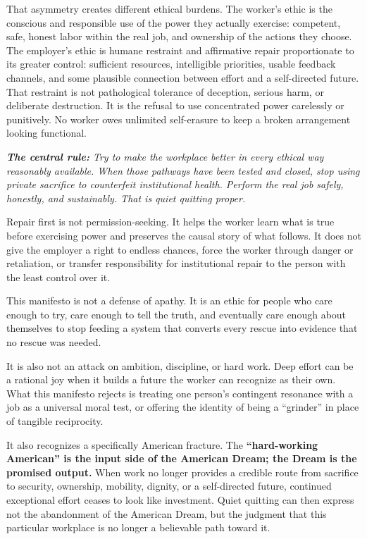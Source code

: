 \documentclass[11pt,oneside]{article}
\renewenvironment{quote}
  {\begin{tcolorbox}[
      enhanced,
      breakable,
      colback=ManifestLight,
      colframe=ManifestRule,
      boxrule=0pt,
      leftrule=3pt,
      arc=0pt,
      outer arc=0pt,
      left=10pt,right=10pt,top=8pt,bottom=8pt,
      before skip=0.8em,after skip=0.8em
    ]\itshape}
  {\end{tcolorbox}}
\begin{document}
That asymmetry creates different ethical burdens. The worker's ethic is
the conscious and responsible use of the power they actually exercise:
competent, safe, honest labor within the real job, and ownership of the
actions they choose. The employer's ethic is humane restraint and
affirmative repair proportionate to its greater control: sufficient
resources, intelligible priorities, usable feedback channels, and some
plausible connection between effort and a self-directed future. That
restraint is not pathological tolerance of deception, serious harm, or
deliberate destruction. It is the refusal to use concentrated power
carelessly or punitively. No worker owes unlimited self-erasure to keep
a broken arrangement looking functional.

\begin{quote}
\textbf{The central rule:} Try to make the workplace better in every
ethical way reasonably available. When those pathways have been tested
and closed, stop using private sacrifice to counterfeit institutional
health. Perform the real job safely, honestly, and sustainably. That is
quiet quitting proper.
\end{quote}

Repair first is not permission-seeking. It helps the worker learn what
is true before exercising power and preserves the causal story of what
follows. It does not give the employer a right to endless chances, force
the worker through danger or retaliation, or transfer responsibility for
institutional repair to the person with the least control over it.

This manifesto is not a defense of apathy. It is an ethic for people who
care enough to try, care enough to tell the truth, and eventually care
enough about themselves to stop feeding a system that converts every
rescue into evidence that no rescue was needed.

It is also not an attack on ambition, discipline, or hard work. Deep
effort can be a rational joy when it builds a future the worker can
recognize as their own. What this manifesto rejects is treating one
person's contingent resonance with a job as a universal moral test, or
offering the identity of being a ``grinder'' in place of tangible
reciprocity.

It also recognizes a specifically American fracture. The
\textbf{``hard-working American'' is the input side of the American
Dream; the Dream is the promised output.} When work no longer provides a
credible route from sacrifice to security, ownership, mobility, dignity,
or a self-directed future, continued exceptional effort ceases to look
like investment. Quiet quitting can then express not the abandonment of
the American Dream, but the judgment that this particular workplace is
no longer a believable path toward it.
\end{document}
